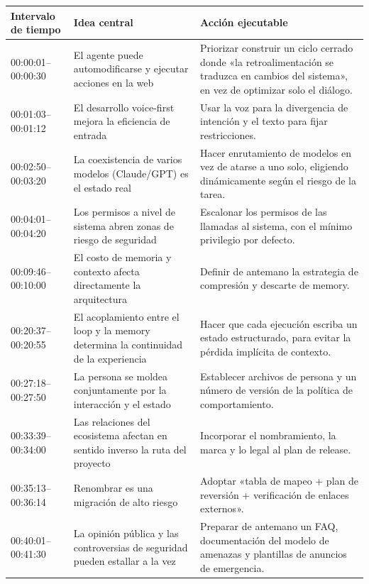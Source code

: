 \begin{longtable}{p{}p{}p{}}
\toprule
\textbf{Intervalo de tiempo} & \textbf{Idea central} & \textbf{Acción ejecutable} \\
\midrule
00:00:01--00:00:30 & El agente puede automodificarse y ejecutar acciones en la web & Priorizar construir un ciclo cerrado donde «la retroalimentación se traduzca en cambios del sistema», en vez de optimizar solo el diálogo. \\
\midrule
00:01:03--00:01:12 & El desarrollo voice-first mejora la eficiencia de entrada & Usar la voz para la divergencia de intención y el texto para fijar restricciones. \\
\midrule
00:02:50--00:03:20 & La coexistencia de varios modelos (Claude/GPT) es el estado real & Hacer enrutamiento de modelos en vez de atarse a uno solo, eligiendo dinámicamente según el riesgo de la tarea. \\
\midrule
00:04:01--00:04:20 & Los permisos a nivel de sistema abren zonas de riesgo de seguridad & Escalonar los permisos de las llamadas al sistema, con el mínimo privilegio por defecto. \\
\midrule
00:09:46--00:10:00 & El costo de memoria y contexto afecta directamente la arquitectura & Definir de antemano la estrategia de compresión y descarte de memory. \\
\midrule
00:20:37--00:20:55 & El acoplamiento entre el loop y la memory determina la continuidad de la experiencia & Hacer que cada ejecución escriba un estado estructurado, para evitar la pérdida implícita de contexto. \\
\midrule
00:27:18--00:27:50 & La persona se moldea conjuntamente por la interacción y el estado & Establecer archivos de persona y un número de versión de la política de comportamiento. \\
\midrule
00:33:39--00:34:00 & Las relaciones del ecosistema afectan en sentido inverso la ruta del proyecto & Incorporar el nombramiento, la marca y lo legal al plan de release. \\
\midrule
00:35:13--00:36:14 & Renombrar es una migración de alto riesgo & Adoptar «tabla de mapeo + plan de reversión + verificación de enlaces externos». \\
\midrule
00:40:01--00:41:30 & La opinión pública y las controversias de seguridad pueden estallar a la vez & Preparar de antemano un FAQ, documentación del modelo de amenazas y plantillas de anuncios de emergencia. \\

\end{longtable}
